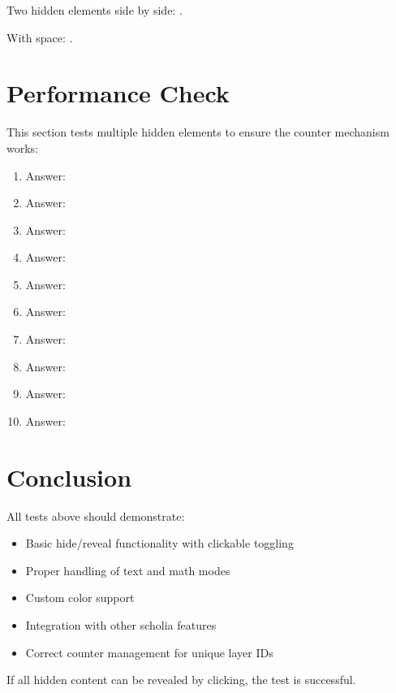 \documentclass[11pt,a4paper]{article}
\begin{document}
Two hidden elements side by side: .

With space:  .

\section{Performance Check}

This section tests multiple hidden elements to ensure the counter mechanism works:

\begin{enumerate}
  \item Answer: 
  \item Answer: 
  \item Answer: 
  \item Answer: 
  \item Answer: 
  \item Answer: 
  \item Answer: 
  \item Answer: 
  \item Answer: 
  \item Answer: 
\end{enumerate}

\section{Conclusion}

All tests above should demonstrate:
\begin{itemize}
  \item Basic hide/reveal functionality with clickable toggling
  \item Proper handling of text and math modes
  \item Custom color support
  \item Integration with other scholia features
  \item Correct counter management for unique layer IDs
\end{itemize}

If all hidden content can be revealed by clicking, the test is successful.
\end{document}
